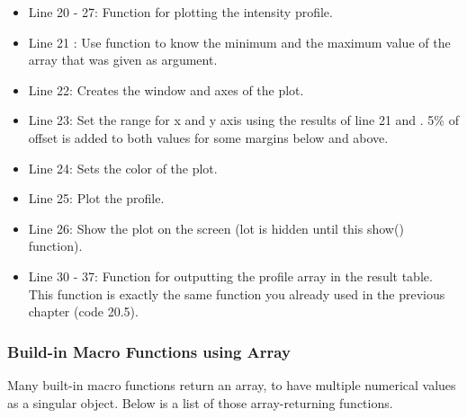 \begin{itemize}
\item Line 20 - 27: Function for plotting the intensity profile.
\item Line 21 : Use  function to know the minimum and
the maximum value of the array that was given as argument.
\item Line 22: Creates the window and axes of the plot. 
\item Line 23: Set the range for x and y axis using the results of line 21
 and . 5\% of offset is added to both values for some
margins below and above.
\item Line 24: Sets the color of the plot. 
\item Line 25: Plot the profile. 
\item Line 26: Show the plot on the screen (lot is hidden until this show()
function).

\item Line 30 - 37: Function for outputting the profile array in the result
table. This function is exactly the same function you already used in the
previous chapter (code 20.5).

\end{itemize}

\subsubsection{Build-in Macro Functions using Array}

Many built-in macro functions return an array, to have multiple numerical values as a singular object. Below is a list of those array-returning functions. 

